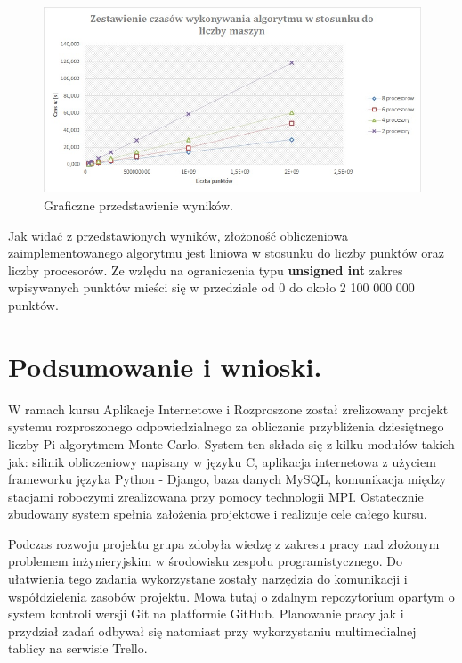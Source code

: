\documentclass[a4paper,12pt]{article}		%
\begin{document}
\begin{center}
\begin{figure}[h!]
\centering
\includegraphics[scale=0.77]{Resources/wykres.jpg}
\caption{Graficzne przedstawienie wyników.} 
\end{figure} 
\end{center}

Jak widać z przedstawionych wyników, złożoność obliczeniowa zaimplementowanego algorytmu jest liniowa w stosunku do liczby punktów oraz liczby procesorów. Ze wzlędu na ograniczenia typu \textbf{unsigned int} zakres wpisywanych punktów mieści się w przedziale od 0 do około 2 100 000 000 punktów. 

\newpage
\section{Podsumowanie i wnioski.}

W ramach kursu Aplikacje Internetowe i Rozproszone został zrelizowany projekt systemu rozproszonego odpowiedzialnego za obliczanie przybliżenia dziesiętnego liczby Pi algorytmem Monte Carlo. System ten składa się z kilku modułów takich jak: silinik obliczeniowy napisany w języku C, aplikacja internetowa z użyciem frameworku języka Python - Django, baza danych MySQL, komunikacja między stacjami roboczymi zrealizowana przy pomocy technologii MPI. Ostatecznie zbudowany system spełnia założenia projektowe i realizuje cele całego kursu.

 Podczas rozwoju projektu grupa zdobyła wiedzę z zakresu pracy nad złożonym problemem inżynieryjskim w środowisku zespołu programistycznego. Do ułatwienia tego zadania wykorzystane zostały narzędzia do komunikacji i współdzielenia zasobów projektu. Mowa tutaj o zdalnym repozytorium opartym o system kontroli wersji Git na platformie GitHub. Planowanie pracy jak i przydział zadań odbywał się natomiast przy wykorzystaniu multimedialnej tablicy na serwisie Trello. 
 
\end{document}
